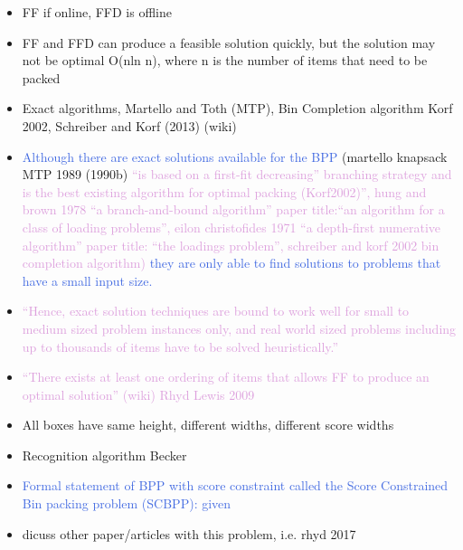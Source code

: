 \documentclass{llncs}
\begin{document}
\begin{itemize}
	\item FF if online, FFD is offline
	\item FF and FFD can produce a feasible solution quickly, but the solution may not be optimal O(nln n), where n is the number of items that need to be packed
	\item Exact algorithms, Martello and Toth (MTP), Bin Completion algorithm Korf 2002, Schreiber and Korf (2013) (wiki)
	\item \textcolor{RoyalBlue}{Although there are exact solutions available for the BPP} (martello knapsack MTP 1989 (1990b) \textcolor{Plum}{``is based on a first-fit decreasing'' branching strategy and is the best existing algorithm for optimal packing (Korf2002)'', hung and brown 1978 ``a branch-and-bound algorithm'' paper title:``an algorithm for a class of loading problems'', eilon christofides 1971 ``a depth-first numerative algorithm'' paper title: ``the loadings problem'', schreiber and korf 2002 bin completion algorithm)} \textcolor{RoyalBlue}{they are only able to find solutions to problems that have a small input size.}
	\item \textcolor{Plum}{``Hence, exact solution techniques are bound to work well for small to medium sized problem instances only, and real world sized problems including up to thousands of items have to be solved heuristically.''}
	\item \textcolor{Plum}{``There exists at least one ordering of items that allows FF to produce an optimal solution'' (wiki) Rhyd Lewis 2009}
	\item All boxes have same height, different widths, different score widths
	\item Recognition algorithm Becker
	\item \textcolor{RoyalBlue}{Formal statement of BPP with score constraint called the Score Constrained Bin packing problem (SCBPP): given}
	\item dicuss other paper/articles with this problem, i.e. rhyd 2017	
\end{itemize}
\end{document}
